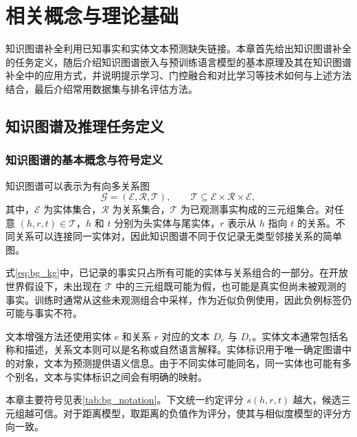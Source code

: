 \chapter{相关概念与理论基础}
\label{chap:background}

知识图谱补全利用已知事实和实体文本预测缺失链接。本章首先给出知识图谱补全的任务定义，随后介绍知识图谱嵌入与预训练语言模型的基本原理及其在知识图谱补全中的应用方式，并说明提示学习、门控融合和对比学习等技术如何与上述方法结合，最后介绍常用数据集与排名评估方法。

\section{知识图谱及推理任务定义}

\subsection{知识图谱的基本概念与符号定义}

知识图谱可以表示为有向多关系图
\begin{equation}
    \mathcal{G}=(\mathcal{E},\mathcal{R},\mathcal{T}),
    \qquad \mathcal{T}\subseteq\mathcal{E}\times\mathcal{R}\times\mathcal{E},
    \label{eq:bg_kg}
\end{equation}
其中，$\mathcal{E}$ 为实体集合，$\mathcal{R}$ 为关系集合，$\mathcal{T}$ 为已观测事实构成的三元组集合。对任意 $(h,r,t)\in\mathcal{T}$，$h$ 和 $t$ 分别为头实体与尾实体，$r$ 表示从 $h$ 指向 $t$ 的关系。不同关系可以连接同一实体对，因此知识图谱不同于仅记录无类型邻接关系的简单图\cite{KGReview_Nickel_2016}。

式\eqref{eq:bg_kg}中，已记录的事实只占所有可能的实体与关系组合的一部分。在开放世界假设下，未出现在 $\mathcal{T}$ 中的三元组既可能为假，也可能是真实但尚未被观测的事实。训练时通常从这些未观测组合中采样，作为近似负例使用，因此负例标签仍可能与事实不符。

文本增强方法还使用实体 $e$ 和关系 $r$ 对应的文本 $D_e$ 与 $D_r$。实体文本通常包括名称和描述，关系文本则可以是名称或自然语言解释。实体标识用于唯一确定图谱中的对象，文本为预测提供语义信息。由于不同实体可能同名，同一实体也可能有多个别名，文本与实体标识之间会有明确的映射。

本章主要符号见表\ref{tab:bg_notation}。下文统一约定评分 $s(h,r,t)$ 越大，候选三元组越可信。对于距离模型，取距离的负值作为评分，使其与相似度模型的评分方向一致。

